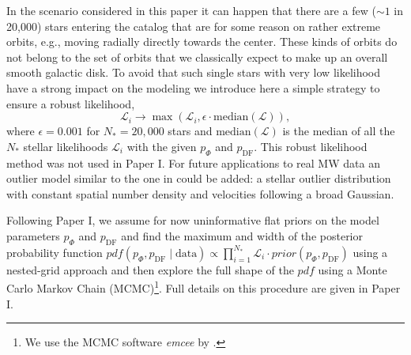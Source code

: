 \documentclass[iop,revtex4,numberedappendix,appendixfloats]{emulateapj}
\newcommand{\pdf}{\ensuremath{pdf}}
\begin{document}
In the scenario considered in this paper it can happen that there are a few ($\sim 1$ in 20,000) stars entering the catalog that are for some reason  on rather extreme orbits, e.g., moving radially directly towards the center. These kinds of orbits do not belong to the set of orbits that we classically expect to make up an overall smooth galactic disk. To avoid that such single stars with very low likelihood have a strong impact on the modeling we introduce here a simple strategy to ensure a robust likelihood,
\begin{equation}
\mathscr{L}_i \longrightarrow \max \left( \mathscr{L}_i, \epsilon \cdot \text{median}(\mathscr{L})\right),
\end{equation}
where $\epsilon = 0.001$ for $N_*=20,000$ stars and $\text{median}(\mathscr{L})$ is the median of all the $N_*$ stellar likelihoods $\mathscr{L}_i$ with the given $p_\Phi$ and $p_\text{DF}$. This robust likelihood method was not used in Paper I. For future applications to real MW data an outlier model similar to the one in \citet{2013ApJ...773...43B} could be added: a stellar outlier distribution with constant spatial number density and velocities following a broad Gaussian.

Following Paper I, we assume for now uninformative flat priors on the model parameters $p_\Phi$ and $p_\text{DF}$ and find the maximum and width of the posterior probability function $pdf(p_\Phi,p_\text{DF} \mid \text{data}) \propto \prod_{i=1}^{N_*} \mathscr{L}_i \cdot prior(p_\Phi,p_\text{DF})$ using a nested-grid approach and then explore the full shape of the $\pdf$ using a Monte Carlo Markov Chain (MCMC)\footnote{We use the MCMC software \emph{emcee} by \citet{2013PASP..125..306F}.}. Full details on this procedure are given in Paper I.
\end{document}
